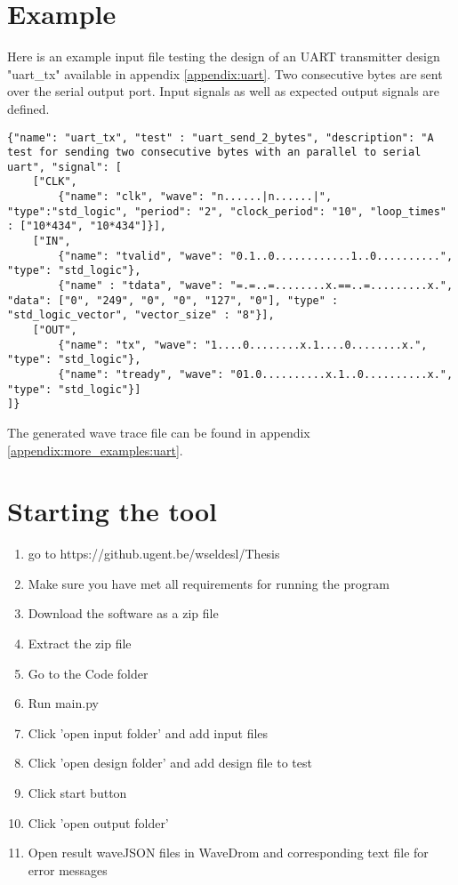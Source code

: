 \section{Example}
Here is an example input file testing the design of an UART transmitter design "uart\_tx" available in appendix \ref{appendix:uart}. Two consecutive bytes are sent over the serial output port. Input signals as well as expected output signals are defined.
\begin{lstlisting}[style=json, caption={}, label={}]
{"name": "uart_tx", "test" : "uart_send_2_bytes", "description": "A test for sending two consecutive bytes with an parallel to serial uart", "signal": [
	["CLK",
		{"name": "clk", "wave": "n......|n......|", "type":"std_logic", "period": "2", "clock_period": "10", "loop_times" : ["10*434", "10*434"]}],
	["IN",
		{"name": "tvalid", "wave": "0.1..0............1..0..........", "type": "std_logic"},
		{"name" : "tdata", "wave": "=.=..=........x.==..=.........x.", "data": ["0", "249", "0", "0", "127", "0"], "type" : "std_logic_vector", "vector_size" : "8"}],
	["OUT",
		{"name": "tx", "wave": "1....0........x.1....0........x.", "type": "std_logic"},
		{"name": "tready", "wave": "01.0..........x.1..0..........x.", "type": "std_logic"}]
]}
\end{lstlisting}
The generated wave trace file can be found in appendix \ref{appendix:more_examples:uart}.\newpage
\newpage
\section{Starting the tool}
\begin{enumerate}
	\item go to https://github.ugent.be/wseldesl/Thesis
	\item Make sure you have met all requirements for running the program 
	\item Download the software as a zip file
	\item Extract the zip file
	\item Go to the Code folder
	\item Run main.py
	\item Click 'open input folder' and add input files
	\item Click 'open design folder' and add design file to test
	\item Click start button
	\item Click 'open output folder'
	\item Open result waveJSON files in WaveDrom and corresponding text file for error messages
\end{enumerate}

	

